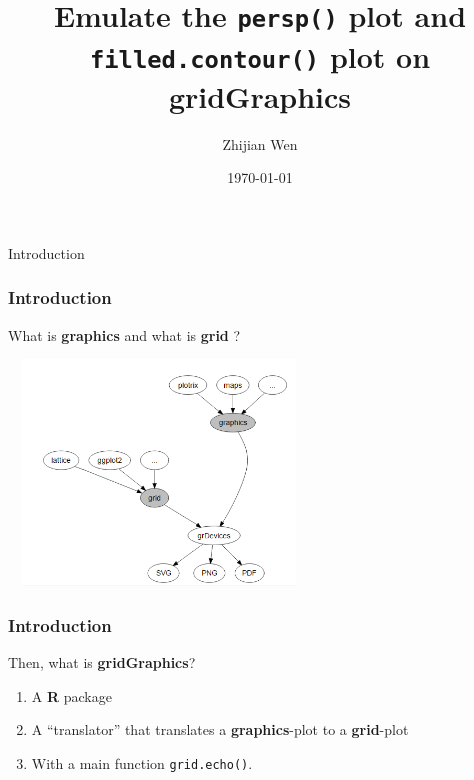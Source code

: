\documentclass{beamer}
\title[Short title]{
Emulate the \texttt{persp()} plot and \texttt{filled.contour()} plot on \textbf{gridGraphics}
} %
\author{Zhijian Wen} %
\institute[UOA] %
{
University of Auckland \\ %
\medskip
\textit{jwen246@aucklanduni.ac.nz} %
}
\date{\today} %
\begin{document}


\begin{frame}
\titlepage %
\end{frame}




\begin{frame}[fragile]
\begin{center}
  \Huge Introduction
\end{center}
\end{frame}


\begin{frame}[fragile]

\frametitle{Introduction}
What is \textbf{graphics} and what is \textbf{grid} ?
\begin{center}
\includegraphics[width = 8cm, height = 6cm]{plot/grid_and_graphics.PNG}
\end{center}

\end{frame}


\begin{frame}[fragile]
\frametitle{Introduction}
Then, what is \textbf{gridGraphics}? \\

\begin{enumerate}
	\item A \textbf{R} package 
	\item A ``translator'' that translates a \textbf{graphics}-plot to a \textbf{grid}-plot 
	\item With a main function \texttt{grid.echo()}.
\end{enumerate}

\end{frame}
\end{document}
